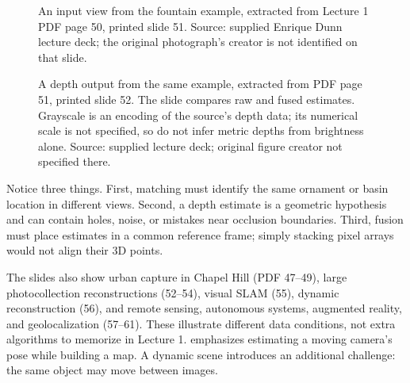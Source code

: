 \documentclass[letterpaper,11pt,english,openany,oneside]{jupyterBook}
\begin{document}
\begin{figure}[H]
\centering
\capstart

\noindent{}
\caption{An input view from the fountain example, extracted from Lecture 1 PDF page 50, printed slide 51. Source: supplied Enrique Dunn lecture deck; the original photograph’s creator is not identified on that slide.}\label{\detokenize{lectures/lecture01/motivation:fig-lec01-fountain-photo}}\end{figure}

\begin{figure}[H]
\centering
\capstart

\noindent{}
\caption{A depth output from the same example, extracted from PDF page 51, printed slide 52. The slide compares raw and fused estimates. Grayscale is an encoding of the source’s depth data; its numerical scale is not specified, so do not infer metric depths from brightness alone. Source: supplied lecture deck; original figure creator not specified there.}\label{\detokenize{lectures/lecture01/motivation:fig-lec01-fountain-depth}}\end{figure}

\sphinxAtStartPar
Notice three things. First, matching must identify the same ornament or basin location in different views. Second, a depth estimate is a geometric hypothesis and can contain holes, noise, or mistakes near occlusion boundaries. Third, fusion must place estimates in a common reference frame; simply stacking pixel arrays would not align their 3D points.

\sphinxAtStartPar
The slides also show urban capture in Chapel Hill (PDF 47–49), large photo\sphinxhyphen{}collection reconstructions (52–54), visual SLAM (55), dynamic reconstruction (56), and remote sensing, autonomous systems, augmented reality, and geolocalization (57–61). These illustrate different data conditions, not extra algorithms to memorize in Lecture 1.  emphasizes estimating a moving camera’s pose while building a map. A dynamic scene introduces an additional challenge: the same object may move between images.
\end{document}
